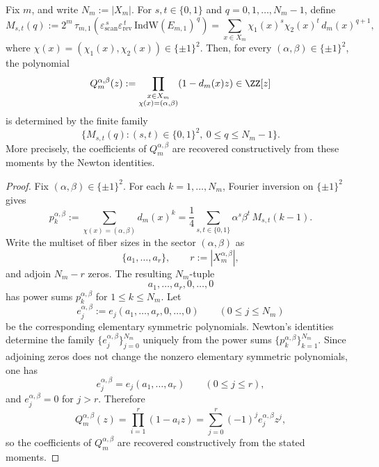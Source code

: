 \begin{proposition}\label{prop:fold-chi-layered-fiber-spectrum-certified-by-signed-powersums}
Fix \(m\), and write \(N_m:=|X_m|\). For \(s,t\in\{0,1\}\) and \(q=0,1,\dots,N_m-1\), define
\[
M_{s,t}(q)
:=
2^m\,\tau_{m,1}\!\left(\varepsilon_{\mathrm{scan}}^{\,s}\varepsilon_{\mathrm{rev}}^{\,t}\,\mathrm{IndW}(E_{m,1})^{\,q}\right)
=
\sum_{x\in X_m}\chi_1(x)^s\chi_2(x)^t\,d_m(x)^{q+1},
\]
where \(\chi(x)=(\chi_1(x),\chi_2(x))\in\{\pm1\}^2\). Then, for every \((\alpha,\beta)\in\{\pm1\}^2\), the polynomial
\[
Q_m^{\alpha,\beta}(z):=
\prod_{\substack{x\in X_m\\ \chi(x)=(\alpha,\beta)}}(1-d_m(x)z)\in\ZZ[z]
\]
is determined by the finite family
\[
\{M_{s,t}(q):(s,t)\in\{0,1\}^2,\ 0\le q\le N_m-1\}.
\]
More precisely, the coefficients of \(Q_m^{\alpha,\beta}\) are recovered constructively from these moments by the Newton identities.
\end{proposition}

\begin{proof}
Fix \((\alpha,\beta)\in\{\pm1\}^2\). For each \(k=1,\dots,N_m\), Fourier inversion on \(\{\pm1\}^2\) gives
\[
p_k^{\alpha,\beta}
:=
\sum_{\chi(x)=(\alpha,\beta)}d_m(x)^k
=
\frac14\sum_{s,t\in\{0,1\}}\alpha^s\beta^t\,M_{s,t}(k-1).
\]
Write the multiset of fiber sizes in the sector \((\alpha,\beta)\) as
\[
\{a_1,\dots,a_r\},
\qquad
r:=|X_m^{\alpha,\beta}|,
\]
and adjoin \(N_m-r\) zeros. The resulting \(N_m\)-tuple
\[
a_1,\dots,a_r,0,\dots,0
\]
has power sums \(p_k^{\alpha,\beta}\) for \(1\le k\le N_m\). Let
\[
e_j^{\alpha,\beta}:=e_j(a_1,\dots,a_r,0,\dots,0)
\qquad(0\le j\le N_m)
\]
be the corresponding elementary symmetric polynomials. Newton's identities determine the family \(\{e_j^{\alpha,\beta}\}_{j=0}^{N_m}\) uniquely from the power sums \(\{p_k^{\alpha,\beta}\}_{k=1}^{N_m}\). Since adjoining zeros does not change the nonzero elementary symmetric polynomials, one has
\[
e_j^{\alpha,\beta}=e_j(a_1,\dots,a_r)
\qquad(0\le j\le r),
\]
and \(e_j^{\alpha,\beta}=0\) for \(j>r\). Therefore
\[
Q_m^{\alpha,\beta}(z)
=
\prod_{i=1}^r(1-a_i z)
=
\sum_{j=0}^r(-1)^j e_j^{\alpha,\beta} z^j,
\]
so the coefficients of \(Q_m^{\alpha,\beta}\) are recovered constructively from the stated moments.
\end{proof}

